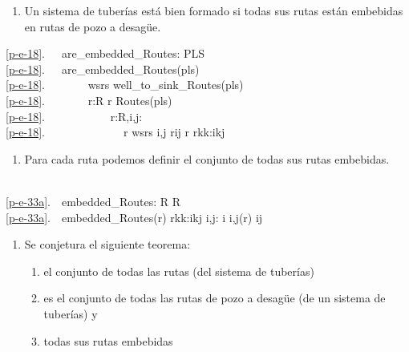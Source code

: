 \mnewfoil

\begin{enumerate}\setei
\item \label{p-e-18} Un sistema de tuberías está bien formado
      si todas sus rutas están embebidas en rutas de pozo a desagüe.
\savei\end{enumerate}

\bp
\ref{p-e-18}.\ \ \ are\_embedded\_Routes: PLS {\RIGHTARROW} \\
\ref{p-e-18}.\ \ \ are\_embedded\_Routes(pls) {\IS}\ \ \ \\
\ref{p-e-18}.\ \ \ \ \ \ \  wsrs {\EQ} well\_to\_sink\_Routes(pls) \\
\ref{p-e-18}.\ \ \ \ \ \ \ {\ALL} r:R {\RDOT} r {\ISIN} Routes(pls) {\DBLRIGHTARROW}\\
\ref{p-e-18}.\ \ \ \ \ \ \ \ \ \ \ {\EXISTS} r{\PRIM}:R,i,j: {\RDOT} \\
\ref{p-e-18}.\ \ \ \ \ \ \ \ \ \ \ \ \ \ r{\PRIM} {\ISIN} wsrs {\WEDGE} {\LBRACE}i,j{\RBRACE}{\SUBSETEQ} r{\PRIM}{\WEDGE}i{\LEQ}j {\WEDGE} r {\EQ} {\LANGLE}r{\PRIM}{\LBRACKET}k{\RBRACKET}{\BAR}k:i{\LEQ}k{\LEQ}j{\RANGLE} 
\ep


\begin{enumerate}\setei
\item \label{p-e-33a} Para cada ruta podemos definir el conjunto de todas sus
                      rutas embebidas. 
\savei\end{enumerate} 

\bp
\>\ \\
\ref{p-e-33a}.\ \ embedded\_Routes: R {\RIGHTARROW} R\\
\ref{p-e-33a}.\ \ embedded\_Routes(r) {\IS} {\LBRACE}{\LANGLE}r{\LBRACKET}k{\RBRACKET}{\BAR}k:i{\LEQ}k{\LEQ}j{\RANGLE} {\BAR} i,j: i {\LBRACE}i,j{\RBRACE}{\SUBSETEQ}(r) {\WEDGE} i{\LEQ}j{\RBRACE}\ \ 
\ep


\begin{enumerate}\setei
\item \label{p-e-33b} Se conjetura el siguiente teorema:
\begin{enumerate}
\item \label{p-e-30}  el conjunto de todas las rutas (del sistema de tuberías)
\item \label{p-e-31}  es el conjunto de todas las rutas de pozo a desagüe (de un
                      sistema de tuberías) y 
\item \label{p-e-32}  todas sus rutas embebidas
\end{enumerate}
\savei\end{enumerate}

